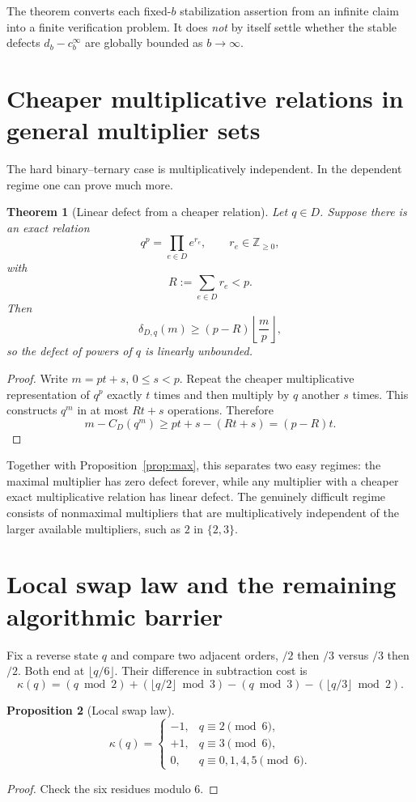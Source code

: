 \documentclass[11pt]{article}
\newtheorem{theorem}{Theorem}[section]
\newtheorem{proposition}[theorem]{Proposition}
\begin{document}
The theorem converts each fixed-$b$ stabilization assertion from an infinite claim into a finite verification problem. It does \emph{not} by itself settle whether the stable defects $d_b-c_b^\infty$ are globally bounded as $b\to\infty$.

\section{Cheaper multiplicative relations in general multiplier sets}
The hard binary--ternary case is multiplicatively independent. In the dependent regime one can prove much more.

\begin{theorem}[Linear defect from a cheaper relation]\label{thm:relation}
Let $q\in D$. Suppose there is an exact relation
\[
 q^p=\prod_{e\in D}e^{r_e},
\qquad r_e\in\mathbb Z_{\ge0},
\]
with
\[
 R:=\sum_{e\in D}r_e<p.
\]
Then
\[
 \boxed{
 \delta_{D,q}(m)\ge(p-R)\left\lfloor\frac mp\right\rfloor,}
\]
so the defect of powers of $q$ is linearly unbounded.
\end{theorem}
\begin{proof}
Write $m=pt+s$, $0\le s<p$. Repeat the cheaper multiplicative representation of $q^p$ exactly $t$ times and then multiply by $q$ another $s$ times. This constructs $q^m$ in at most $Rt+s$ operations. Therefore
\[
 m-C_D(q^m)\ge pt+s-(Rt+s)=(p-R)t.
\]
\end{proof}

Together with Proposition~\ref{prop:max}, this separates two easy regimes: the maximal multiplier has zero defect forever, while any multiplier with a cheaper exact multiplicative relation has linear defect. The genuinely difficult regime consists of nonmaximal multipliers that are multiplicatively independent of the larger available multipliers, such as $2$ in $\{2,3\}$.

\section{Local swap law and the remaining algorithmic barrier}
Fix a reverse state $q$ and compare two adjacent orders, $/2$ then $/3$ versus $/3$ then $/2$. Both end at $\lfloor q/6\rfloor$. Their difference in subtraction cost is
\[
 \kappa(q)=(q\bmod2)+(\lfloor q/2\rfloor\bmod3)
 -(q\bmod3)-(\lfloor q/3\rfloor\bmod2).
\]
\begin{proposition}[Local swap law]\label{prop:swap}
\[
 \boxed{
 \kappa(q)=\begin{cases}
 -1,&q\equiv2\pmod6,\\
 +1,&q\equiv3\pmod6,\\
 0,&q\equiv0,1,4,5\pmod6.
 \end{cases}}
\]
\end{proposition}
\begin{proof}
Check the six residues modulo $6$.
\end{proof}
\end{document}
